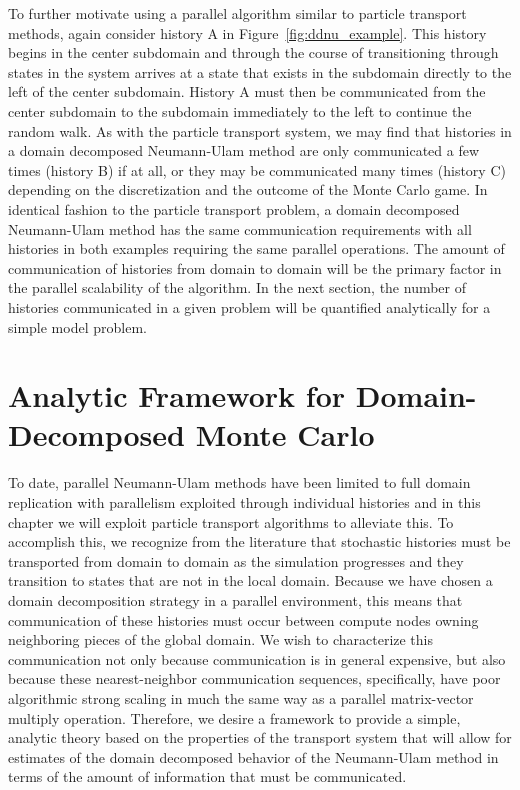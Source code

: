 To further motivate using a parallel algorithm similar to particle
transport methods, again consider history A in
Figure~\ref{fig:ddnu_example}. This history begins in the center
subdomain and through the course of transitioning through states in
the system arrives at a state that exists in the subdomain directly to
the left of the center subdomain. History A must then be communicated
from the center subdomain to the subdomain immediately to the left to
continue the random walk. As with the particle transport system, we
may find that histories in a domain decomposed Neumann-Ulam method are
only communicated a few times (history B) if at all, or they may be
communicated many times (history C) depending on the discretization
and the outcome of the Monte Carlo game. In identical fashion to the
particle transport problem, a domain decomposed Neumann-Ulam method
has the same communication requirements with all histories in both
examples requiring the same parallel operations. The amount of
communication of histories from domain to domain will be the primary
factor in the parallel scalability of the algorithm. In the next
section, the number of histories communicated in a given problem will
be quantified analytically for a simple model problem.

\clearpage

\section{Analytic Framework for Domain-Decomposed Monte Carlo\ }
\label{sec:analytic_framework}
To date, parallel Neumann-Ulam methods have been limited to full
domain replication with parallelism exploited through individual
histories \citep{alexandrov_efficient_1998} and in this chapter we
will exploit particle transport algorithms to alleviate this. To
accomplish this, we recognize from the literature that stochastic
histories must be transported from domain to domain as the simulation
progresses and they transition to states that are not in the local
domain. Because we have chosen a domain decomposition strategy in a
parallel environment, this means that communication of these histories
must occur between compute nodes owning neighboring pieces of the
global domain. We wish to characterize this communication not only
because communication is in general expensive, but also because these
nearest-neighbor communication sequences, specifically, have poor
algorithmic strong scaling \citep{gropp_high-performance_2001} in much
the same way as a parallel matrix-vector multiply
operation. Therefore, we desire a framework to provide a simple,
analytic theory based on the properties of the transport system that
will allow for estimates of the domain decomposed behavior of the
Neumann-Ulam method in terms of the amount of information that must be
communicated.

